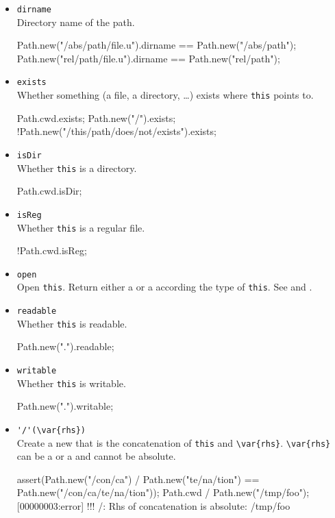 \begin{itemize}
\item \lstinline|dirname|\\
  Directory name of the path.
\begin{urbiassert}[firstnumber=last]
Path.new("/abs/path/file.u").dirname == Path.new("/abs/path");
Path.new("rel/path/file.u").dirname  == Path.new("rel/path");
\end{urbiassert}

\item \lstinline|exists|\\
  Whether something (a file, a directory, \ldots) exists where
  \lstinline|this| points to.
\begin{urbiassert}[firstnumber=last]
Path.cwd.exists;
Path.new("/").exists;
!Path.new("/this/path/does/not/exists").exists;
\end{urbiassert}

\item \lstinline|isDir|\\
  Whether \lstinline|this| is a directory.
\begin{urbiassert}[firstnumber=last]
Path.cwd.isDir;
\end{urbiassert}

\item \lstinline|isReg|\\
  Whether \lstinline|this| is a regular file.
\begin{urbiassert}[firstnumber=last]
!Path.cwd.isReg;
\end{urbiassert}

\item \lstinline|open|\\
  Open \lstinline|this|. Return either a  or a
   according the type of \lstinline|this|. See
   and .

\item \lstinline|readable|\\
  Whether \lstinline|this| is readable.
\begin{urbiassert}[firstnumber=last]
Path.new(".").readable;
\end{urbiassert}

\item \lstinline|writable|\\
  Whether \lstinline|this| is writable.
\begin{urbiassert}[firstnumber=last]
Path.new(".").writable;
\end{urbiassert}

\item \lstinline|'/'(\var{rhs})|\\
  Create a new  that is the concatenation of
  \lstinline|this| and \lstinline|\var{rhs}|. \lstinline|\var{rhs}|
  can be a  or a  and cannot be absolute.
\begin{urbiscript}[firstnumber=last]
assert(Path.new("/con/ca") / Path.new("te/na/tion")
       == Path.new("/con/ca/te/na/tion"));
Path.cwd / Path.new("/tmp/foo");
[00000003:error] !!! /: Rhs of concatenation is absolute: /tmp/foo
\end{urbiscript}


\end{itemize}
